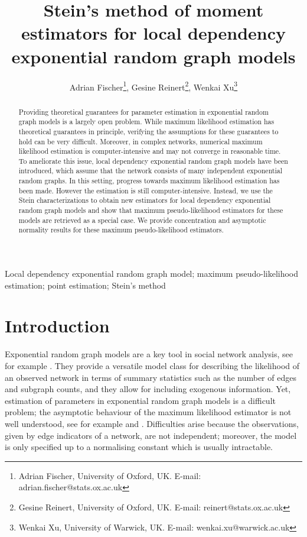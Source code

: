 \documentclass{article}
\title{Stein's method of moment estimators for local dependency exponential random graph models}
\author{Adrian Fischer\footnote{Adrian Fischer, University of Oxford, UK. E-mail: adrian.fischer@stats.ox.ac.uk}, Gesine Reinert\footnote{Gesine Reinert, University of Oxford, UK. E-mail: reinert@stats.ox.ac.uk}, Wenkai Xu\footnote{Wenkai Xu, University of Warwick, UK. E-mail: wenkai.xu@warwick.ac.uk}}
\begin{document}
\maketitle

\begin{abstract}
    Providing theoretical guarantees for parameter estimation in exponential random graph models is a largely open problem.  While maximum likelihood estimation has theoretical guarantees in principle, verifying the assumptions for these guarantees to hold can be very difficult. Moreover, in complex networks, numerical maximum likelihood estimation is computer-intensive and may not converge in reasonable time. To ameliorate this issue, local dependency exponential random graph models have been introduced, which assume that the network consists of many independent exponential random graphs. In this setting, progress towards maximum likelihood estimation has been made. However the estimation is still computer-intensive. Instead, we use the Stein characterizations to obtain new estimators for local dependency exponential random graph models and show that  maximum pseudo-likelihood estimators for these models are retrieved as a special case. We provide concentration and asymptotic normality results for these maximum pseudo-likelihood estimators.
\end{abstract}

 Local dependency exponential random graph model; maximum pseudo-likelihood estimation; point estimation; Stein's method

\section{Introduction}

Exponential random graph models are a key tool in social network analysis, see for example  \cite{harris2013introduction, lusher2013exponential, wasserman1994social}. They provide  a versatile model class for describing the likelihood of an observed network in terms of summary statistics such as the number of edges and  subgraph counts, and they allow for including exogenous information. Yet, estimation of parameters in exponential random graph models is a difficult problem;   the asymptotic behaviour of the maximum likelihood estimator is not well understood, see for example \cite{schweinberger2020exponential} and \cite{stewart2026rates}. Difficulties arise because the observations, given by edge indicators of a network, are not independent; moreover, the model is only specified up to a normalising constant which is usually intractable. 
\end{document}
